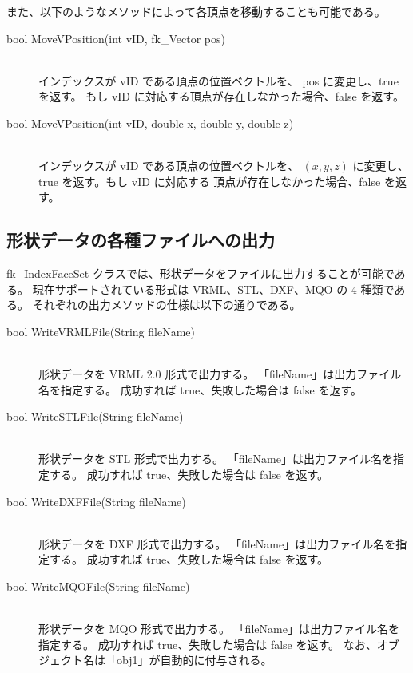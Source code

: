 また、以下のようなメソッドによって各頂点を移動することも可能である。
\begin{description}
\item[bool MoveVPosition(int vID, fk\_Vector pos)] ~ \\
	インデックスが vID である頂点の位置ベクトルを、
	pos に変更し、true を返す。
	もし vID に対応する頂点が存在しなかった場合、false を返す。\\

\item[bool MoveVPosition(int vID, double x, double y, double z)] ~ \\
	インデックスが vID である頂点の位置ベクトルを、
	\((x, y, z)\) に変更し、true を返す。もし vID に対応する
	頂点が存在しなかった場合、false を返す。
\end{description}

\subsection{形状データの各種ファイルへの出力}
fk\_IndexFaceSet クラスでは、形状データをファイルに出力することが可能である。
現在サポートされている形式は VRML、STL、DXF、MQO の 4 種類である。
それぞれの出力メソッドの仕様は以下の通りである。

\begin{description}
\item[bool WriteVRMLFile(String fileName)] ~ \\
	形状データを VRML 2.0 形式で出力する。
	「fileName」は出力ファイル名を指定する。
	成功すれば true、失敗した場合は false を返す。\\

\item[bool WriteSTLFile(String fileName)] ~ \\
	形状データを STL 形式で出力する。
	「fileName」は出力ファイル名を指定する。
	成功すれば true、失敗した場合は false を返す。\\

\item[bool WriteDXFFile(String fileName)] ~ \\
	形状データを DXF 形式で出力する。
	「fileName」は出力ファイル名を指定する。
	成功すれば true、失敗した場合は false を返す。\\

\item[bool WriteMQOFile(String fileName)] ~ \\
	形状データを MQO 形式で出力する。
	「fileName」は出力ファイル名を指定する。
	成功すれば true、失敗した場合は false を返す。
	なお、オブジェクト名は「obj1」が自動的に付与される。		
\end{description}

